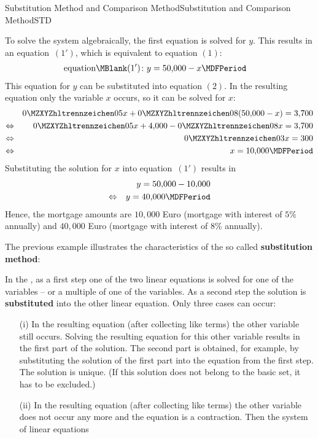 \begin{MXContent}{Substitution Method and Comparison Method}{Substitution and Comparison Method}{STD}
\begin{MExample}
To solve the system algebraically, the first equation is solved for $y$. This results in an  
equation~$(1')$, which is equivalent to equation $(1)$:
\begin{eqnarray*}
\mbox{equation}\MBlank (1') & \colon y = 50{,}000 - x\MDFPeriod 
\end{eqnarray*}
This equation for $y$ can be substituted into equation $(2)$. In the resulting 
equation only the variable  
$x$ occurs, so it can be solved for $x$:
\begin{eqnarray*}
& & \MZahl{0}{05} x + \MZahl{0}{08} (50{,}000 - x) = 3{,}700 \\
\Leftrightarrow & & \MZahl{0}{05} x + 4{,}000 - \MZahl{0}{08} x = 3{,}700 \\
\Leftrightarrow & & \MZahl{0}{03} x = 300 \\
\Leftrightarrow & & x = 10{,}000\MDFPeriod 
\end{eqnarray*}
Substituting the solution for $x$ into equation~$(1')$ results in
\begin{eqnarray*}
& & y = 50{,}000 - 10{,}000 \\
\Leftrightarrow & & y = 40{,}000\MDFPeriod 
\end{eqnarray*}
Hence, the mortgage amounts are $10{,}000$ Euro (mortgage with interest of $5\%$ annually) and
$40{,}000$ Euro (mortgage with interest of $8\%$ annually).
\end{MExample}
The previous example illustrates the characteristics of the so called 
\textbf{substitution method}:
\begin{MInfo}
In the , as a first step 
one of the two linear equations is solved for one of the variables -- or a multiple 
of one of the variables. As a second step the solution is 
\textbf{substituted} into the other linear equation. Only three cases can occur:
\begin{itemize}
\item[(i)]{In the resulting equation (after collecting like terms) the other variable
still occurs. Solving the resulting equation for this other variable results in the first
part of the solution. The second part is obtained, for example, by substituting the solution
of the first part into the equation from the first step. The solution is unique. (If this
solution does not belong to the basic set, it has to be excluded.)}
\item[(ii)]{In the resulting equation (after collecting like terms) the other variable
does not occur any more and the equation is a contraction. Then the system of linear equations
}
\end{itemize}
\end{MInfo}
\end{MXContent}
